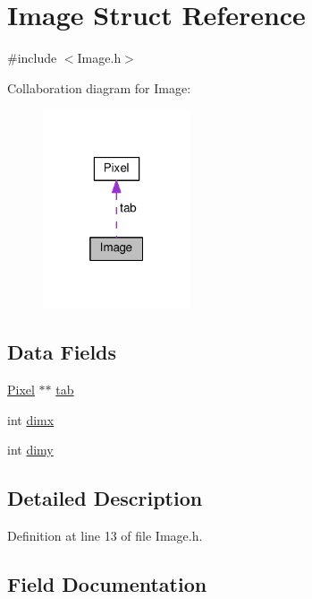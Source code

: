 \hypertarget{structImage}{}\section{Image Struct Reference}
\label{structImage}


{\ttfamily \#include $<$Image.\+h$>$}



Collaboration diagram for Image\+:\nopagebreak
\begin{figure}[H]
\begin{center}
\leavevmode
\includegraphics[width=124pt]{structImage__coll__graph}
\end{center}
\end{figure}
\subsection*{Data Fields}
\begin{DoxyCompactItemize}
\item 
\hyperlink{structPixel}{Pixel} $\ast$$\ast$ \hyperlink{structImage_aad00390430c4e4e3a5a71bb919a4076c}{tab}
\item 
int \hyperlink{structImage_a1fbf685f50372de48b7290cd02a77b0c}{dimx}
\item 
int \hyperlink{structImage_a2e937e4780121e32bce2ccae87069b68}{dimy}
\end{DoxyCompactItemize}


\subsection{Detailed Description}


Definition at line 13 of file Image.\+h.



\subsection{Field Documentation}
\hypertarget{structImage_a1fbf685f50372de48b7290cd02a77b0c}{}
